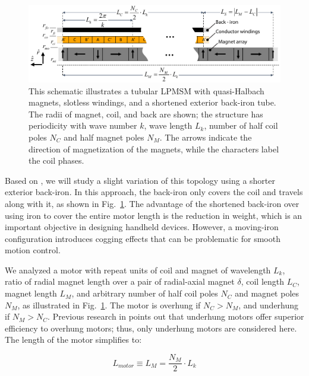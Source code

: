     
        \begin{figure}[ht]
          \centering
          \includegraphics[width=5.8in]{chap3/images/PMLSM.pdf}
          \caption{This schematic illustrates a tubular LPMSM with quasi-Halbach magnets, slotless windings, and a shortened exterior back-iron tube. The radii of magnet, coil, and back are shown; the structure has periodicity with wave number $k$, wave length $L_k$, number of half coil poles $N_C$ and half magnet poles $N_M$. The arrows indicate the direction of magnetization of the magnets, while the characters label the coil phases.}
          \label{fig:chapter/hm/PMLSM motor construction fullpage}
        \end{figure}
    
        
        Based on \cite{ruddy2014}, we will study a slight variation of this topology using a shorter exterior back-iron. In this approach, the back-iron only covers the coil and travels along with it, as shown in Fig.~\ref{fig:chapter/hm/PMLSM motor construction fullpage}. The advantage of the shortened back-iron over using iron to cover the entire motor length is the reduction in weight, which is an important objective in designing handheld devices. However, a moving-iron configuration introduces cogging effects that can be problematic for smooth motion control.
        
        
        We analyzed a motor with repeat units of coil and magnet of wavelength $L_k$, ratio of radial magnet length over a pair of radial-axial magnet $\delta$, coil length $L_C$, magnet length $L_M$, and arbitrary number of half coil poles  $N_C$ and magnet poles $N_M$, as illustrated in Fig.~\ref{fig:chapter/hm/PMLSM motor construction fullpage}. The motor is overhung if $N_C>N_M$, and underhung if $N_M>N_C$. Previous research in \cite{Ruddy2015} points out that underhung motors offer superior efficiency to overhung motors; thus, only underhung motors are considered here. The length of the motor simplifies to:
        
        
        \begin{equation}
            L_{motor}\equiv L_M=\frac{N_M}2\cdot L_k
            \label{eq:PMLSMs motor length}
        \end{equation}
        
